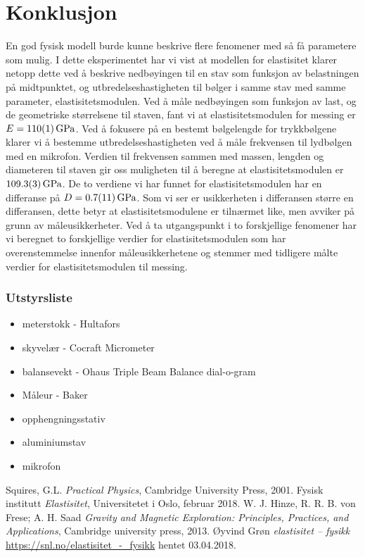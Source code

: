 \documentclass[%
 reprint,
 amsmath,amssymb,
 aps,
 norsk,
 booktabs
]{revtex4-1}
\begin{document}
\section{Konklusjon}
En god fysisk modell burde kunne beskrive flere fenomener med så få parametere som mulig. I dette eksperimentet har vi vist at modellen for elastisitet klarer netopp dette ved å beskrive nedbøyingen til en stav som funksjon av belastningen på midtpunktet, og utbredelseshastigheten til bølger i samme stav med samme parameter, elastisitetsmodulen.
Ved å måle nedbøyingen som funksjon av last, og de geometriske størrelsene til staven, fant vi at elastisitetsmodulen for messing er $E=\SI{110\pm1}{\giga\pascal}$.
Ved å fokusere på en bestemt bølgelengde for trykkbølgene klarer vi å bestemme utbredelseshastigheten ved å måle frekvensen til lydbølgen med en mikrofon. Verdien til frekvensen sammen med massen, lengden og diameteren til staven gir oss muligheten til å beregne at elastisitetsmodulen er $\SI{109.3\pm0.3}{\giga\pascal}$.
De to verdiene vi har funnet for elastisitetsmodulen har en differanse på $D = \SI{0.7\pm1.1}{\giga\pascal}$. Som vi ser er usikkerheten i differansen større en differansen, dette betyr at elastisitetsmodulene er tilnærmet like, men avviker på grunn av måleusikkerheter. Ved å ta utgangspunkt i to forskjellige fenomener har vi beregnet to forskjellige verdier for elastisitetsmodulen som har overenstemmelse innenfor måleusikkerhetene og stemmer med tidligere målte verdier for elastisitetsmodulen til messing.
\subsubsection*{Utstyrsliste}
\begin{itemize}
\label{utstyr}
\item meterstokk - Hultafors
\item skyvelær - Cocraft Micrometer
\item balansevekt - Ohaus Triple Beam Balance dial-o-gram
\item Måleur - Baker
\item opphengningsstativ
\item aluminiumstav
\item mikrofon
\end{itemize}
\begin{thebibliography}{9}
Squires, G.L. \emph{Practical Physics}, Cambridge University Press, 2001.
Fysisk institutt \emph{Elastisitet}, Universitetet i Oslo, februar 2018.
W. J. Hinze, R. R. B. von Frese; A. H. Saad \emph{Gravity and Magnetic Exploration: Principles, Practices, and Applications}, Cambridge university press, 2013.
Øyvind Grøn \emph{elastisitet – fysikk} \url{https://snl.no/elastisitet_-_fysikk} hentet 03.04.2018.
\end{thebibliography}
\end{document}
